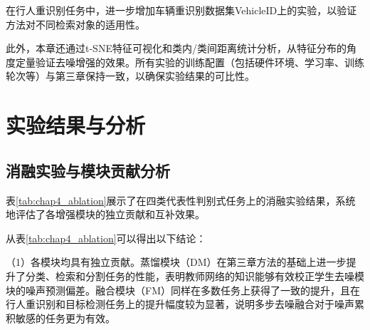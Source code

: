 在行人重识别任务中，进一步增加车辆重识别数据集VehicleID\cite{liu2016deep}上的实验，以验证方法对不同检索对象的适用性。

此外，本章还通过t-SNE\cite{maaten2008visualizing}特征可视化和类内/类间距离统计分析，从特征分布的角度定量验证去噪增强的效果。所有实验的训练配置（包括硬件环境、学习率、训练轮次等）与第三章保持一致，以确保实验结果的可比性。

\section{实验结果与分析}
\label{sec:chap4_exp_result}

\subsection{消融实验与模块贡献分析}

表\ref{tab:chap4_ablation}展示了在四类代表性判别式任务上的消融实验结果，系统地评估了各增强模块的独立贡献和互补效果。

\begin{table}[htbp]
\centering
\caption{本章各模块在多种判别式任务上的消融实验结果\protect\\[-2pt]{\rm Table\;\thetable\quad Ablation study of the proposed modules on multiple discriminative tasks}}\label{tab:chap4_ablation}
\vspace{0.2cm}
\renewcommand{\arraystretch}{1.2}
\end{table}

从表\ref{tab:chap4_ablation}可以得出以下结论：

（1）各模块均具有独立贡献。蒸馏模块（DM）在第三章方法的基础上进一步提升了分类、检索和分割任务的性能，表明教师网络的知识能够有效校正学生去噪模块的噪声预测偏差。融合模块（FM）同样在多数任务上获得了一致的提升，且在行人重识别和目标检测任务上的提升幅度较为显著，说明多步去噪融合对于噪声累积敏感的任务更为有效。


